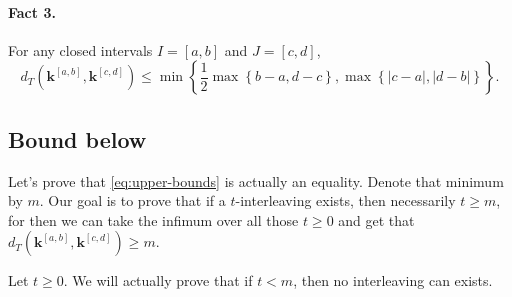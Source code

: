 \documentclass[11pt]{article}
\begin{document}
\paragraph{Fact 3.} 
For any closed intervals \(I=[a,b]\) and $J=[c,d] $,
\begin{equation}\label{eq:upper-bounds}
d_T(\mathbf{k}^{[a,b]}, \mathbf{k}^{[c,d]}) \leq \min\left\{ \frac{1}{2}\max\left\{ b-a,d-c \right\},\max\left\{ |c-a|,|d-b|\right\}\right\}.
\end{equation}

\subsection{Bound below}

Let's prove that \eqref{eq:upper-bounds}
is actually an equality.
Denote that minimum by \(m\).
Our goal is to prove that if 
a \(t\)-interleaving exists, then 
necessarily \(t\geq m\),
for then we can take the infimum over all 
those \(t\geq 0\) and get that \(  d_T(\mathbf{k}^{[a,b]}, \mathbf{k}^{[c,d]})\geq m\).

Let \(t\geq0\).
We will actually prove that if \(t<m\), then no interleaving can exists.
\end{document}
